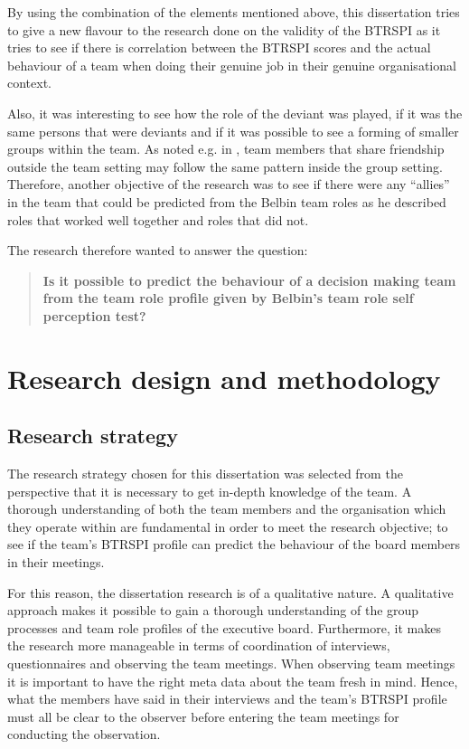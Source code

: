 \documentclass[a4paper,12pt,titlepage]{report}
\begin{document}
  By using the combination of the elements mentioned above, this 
  dissertation tries to give a new flavour to the research done on the validity
  of the BTRSPI as it tries to see if there is correlation between
  the BTRSPI scores and the actual behaviour of a team when doing their
  genuine job in their genuine organisational context. 

  Also, it was interesting to see how the role of the deviant was played, if it was
  the same persons that were deviants and if it was possible to see a forming of
  smaller groups within the team. As noted e.g. in \citet{mhsh}, team members
  that share friendship outside the team setting may follow the same pattern inside
  the group setting. Therefore, another objective of the research was to see
  if there were any ``allies'' in the team that could be predicted from the
  Belbin team roles as he described roles that worked well together and roles that
  did not.

  The research therefore wanted to answer the question:
  \begin{quote}
    \bf
    Is it possible to predict the behaviour of a decision making team
    from the team role profile given by Belbin's team role self perception test?
    \sf
  \end{quote}
  
  \chapter{Research design and methodology}
  \section{Research strategy}
  The research strategy chosen for this dissertation was selected from
  the perspective that it is necessary to get in-depth knowledge of
  the team. A thorough understanding of both the team members and
  the organisation which they operate within are
  fundamental in order to meet the research objective; 
  to see if the team's BTRSPI profile can predict the behaviour of the board
  members in their meetings.

  For this reason, the dissertation research is of a qualitative nature. 
  A qualitative approach makes it possible to gain a thorough understanding
  of the group processes and team role profiles of the executive board.
  Furthermore, it makes the research more manageable in terms of
  coordination of interviews, questionnaires and observing the
  team meetings. When observing team meetings it is important to
  have the right meta data about the team fresh in mind. Hence, what the
  members have said in their interviews and the team's BTRSPI profile must
  all be clear to the observer before entering the team meetings for
  conducting the observation.
\end{document}
